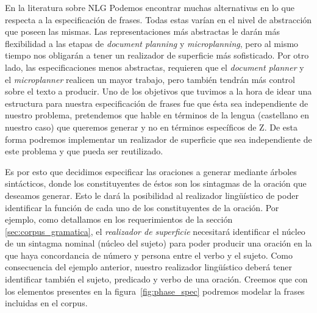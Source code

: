 En la literatura sobre NLG Podemos encontrar muchas alternativas en lo que respecta a la especificación de frases. Todas estas varían en el nivel de abstracción que poseen las mismas. Las representaciones más abstractas le darán más flexibilidad a las etapas de \textit{document planning} y \textit{microplanning}, pero al mismo tiempo nos obligarán a tener un realizador de superficie más sofisticado. Por otro lado, las especificaciones menos abstractas, requieren que el \textit{document planner} y el \textit{microplanner} realicen un mayor trabajo, pero también tendrán más control sobre el texto a producir. Uno de los objetivos que tuvimos a la hora de idear una estructura para nuestra especificación de frases fue que ésta sea independiente de nuestro problema, pretendemos que hable en términos de la lengua (castellano en nuestro caso) que queremos generar y no en términos específicos de Z. De esta forma podremos implementar un realizador de superficie que sea independiente de este problema y que pueda ser reutilizado. %

Es por esto que decidimos especificar las oraciones a generar mediante árboles sintácticos, donde los constituyentes de éstos son los sintagmas de la oración que deseamos generar. Esto le dará la posibilidad al realizador lingüístico de poder identificar la función de cada uno de los constituyentes de la oración. Por ejemplo, como detallamos en los requerimientos de la sección \ref{sec:corpus_gramatica}, el \emph{realizador de superficie} necesitará identificar el núcleo de un sintagma nominal (núcleo del sujeto) para poder producir una oración en la que haya concordancia de número y persona entre el verbo y el sujeto. Como consecuencia del ejemplo anterior, nuestro realizador lingüístico deberá tener identificar también el sujeto, predicado y verbo de una oración. Creemos que con los elementos presentes en la figura~\ref{fig:phase_spec} podremos modelar la frases incluidas en el corpus.

